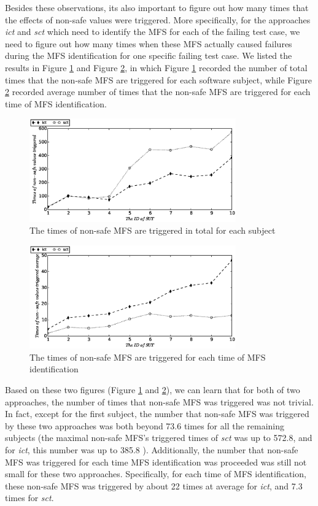 \documentclass[10pt,journal,compsoc]{IEEEtran}
\begin{document}
{\color{blue}Besides these observations, its also important to figure out how many times that the effects of non-safe values were triggered. More specifically, for the approaches \emph{ict} and \emph{sct} which need to identify the MFS for each of the failing test case, we need to figure out how many times when these MFS actually caused failures during the MFS identification for one specific failing test case. We listed the results in Figure \ref{sen_safe_NonTrigger} and Figure \ref{sen_safe_NonTriggerAvg}, in which Figure \ref{sen_safe_NonTrigger} recorded the number of total times that the non-safe MFS are triggered for each software subject, while Figure \ref{sen_safe_NonTriggerAvg} recorded average number of times that the non-safe MFS are triggered for each time of MFS identification.

\begin{figure}[htbp]
 \includegraphics[width=3.5in]{enNonSafe.eps}
\caption{The times of non-safe MFS are triggered in total for each subject}
\label{sen_safe_NonTrigger}
\end{figure}


\begin{figure}[htbp]
 \includegraphics[width=3.5in]{enNonSafeTriggerAvg.eps}
\caption{The times of non-safe MFS are triggered for each time of MFS identification}
\label{sen_safe_NonTriggerAvg}
\end{figure}

Based on these two figures (Figure \ref{sen_safe_NonTrigger} and \ref{sen_safe_NonTriggerAvg}), we can learn that for both of two approaches, the number of times that non-safe MFS was triggered was not trivial. In fact, except for the first subject, the number that non-safe MFS was triggered by these two approaches was both beyond 73.6 times for all the remaining subjects (the maximal non-safe MFS's triggered times of \emph{sct} was up to 572.8, and for \emph{ict}, this number was up to 385.8 ). Additionally, the number that non-safe MFS was triggered for each time MFS identification was proceeded was still not small for these two approaches. Specifically, for each time of MFS identification, these non-safe MFS was triggered by about 22 times at average for \emph{ict}, and 7.3 times for \emph{sct}.
}
\end{document}
